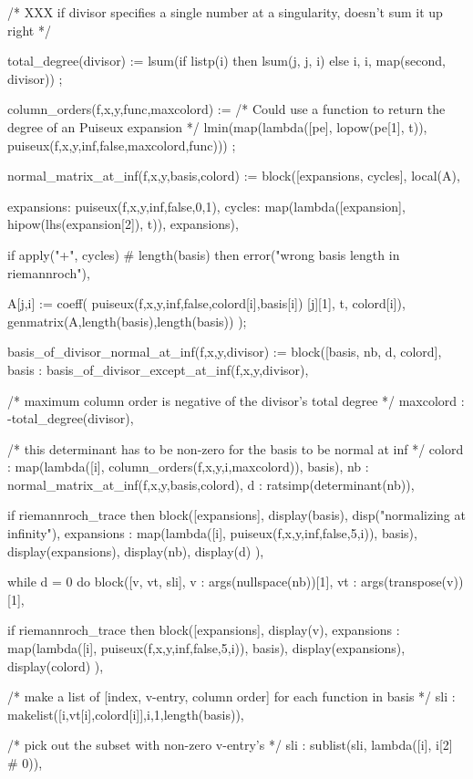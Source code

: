 \begin{maximacommonsmall}
/* XXX if divisor specifies a single number at a singularity, doesn't sum it up right */

total_degree(divisor) :=
  lsum(if listp(i) then lsum(j, j, i) else i, i, map(second, divisor))
;

column_orders(f,x,y,func,maxcolord) :=
  /* Could use a function to return the degree of an Puiseux expansion */
  lmin(map(lambda([pe], lopow(pe[1], t)), puiseux(f,x,y,inf,false,maxcolord,func)))
;

normal_matrix_at_inf(f,x,y,basis,colord) := block([expansions, cycles], local(A),

  expansions: puiseux(f,x,y,inf,false,0,1),
  cycles: map(lambda([expansion], hipow(lhs(expansion[2]), t)), expansions),

  if apply("+", cycles) # length(basis) then
     error("wrong basis length in riemannroch"),

  A[j,i] := coeff(  puiseux(f,x,y,inf,false,colord[i],basis[i])  [j][1], t, colord[i]),
  genmatrix(A,length(basis),length(basis))
);

basis_of_divisor_normal_at_inf(f,x,y,divisor) := block([basis, nb, d, colord],
  basis : basis_of_divisor_except_at_inf(f,x,y,divisor),

  /* maximum column order is negative of the divisor's total degree */
  maxcolord : -total_degree(divisor),

  /* this determinant has to be non-zero for the basis to be normal at inf */
  colord : map(lambda([i], column_orders(f,x,y,i,maxcolord)), basis),
  nb : normal_matrix_at_inf(f,x,y,basis,colord),
  d : ratsimp(determinant(nb)),

  if riemannroch_trace then block([expansions],
    display(basis),
    disp("normalizing at infinity"),
    expansions : map(lambda([i], puiseux(f,x,y,inf,false,5,i)), basis),
    display(expansions),
    display(nb),
    display(d)
  ),

  while d = 0 do block([v, vt, sli],
    v : args(nullspace(nb))[1],
    vt : args(transpose(v))[1],

    if riemannroch_trace then block([expansions],
      display(v),
      expansions : map(lambda([i], puiseux(f,x,y,inf,false,5,i)), basis),
      display(expansions),
      display(colord)
    ),

    /* make a list of [index, v-entry, column order] for each function in basis */
    sli : makelist([i,vt[i],colord[i]],i,1,length(basis)),

    /* pick out the subset with non-zero v-entry's */
    sli : sublist(sli, lambda([i], i[2] # 0)),


\end{maximacommonsmall}
